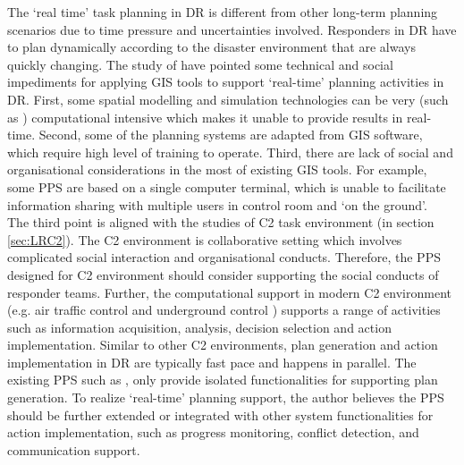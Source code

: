 The `real time' task planning in \ac{DR} is different from other long-term planning scenarios due to time pressure and uncertainties involved.  Responders in DR have to plan dynamically according to the disaster environment that are always quickly changing. The study of \cite{Zerger2003} have pointed some technical and social impediments for applying \ac{GIS} tools to support `real-time' planning activities in DR. First, some spatial modelling and simulation technologies can be very (such as \cite{Eglese1994} ) computational intensive which makes it unable to provide results in real-time. Second, some of the planning systems are adapted from \ac{GIS} software, which require high level of training to operate. Third, there are lack of social and organisational considerations in the most of existing \ac{GIS} tools. For example, some PPS are based on a single computer terminal, which is unable to facilitate information sharing with multiple users in control room and `on the ground'. \\

The third point is aligned with the studies of \ac{C2} task environment (in section \ref{sec:LRC2}). The C2 environment is collaborative setting which involves complicated social interaction and organisational conducts. Therefore, the PPS designed for \ac{C2} environment should consider supporting the social conducts of responder teams. Further, the computational support in modern \ac{C2} environment (e.g. air traffic control \cite{Mercer2014} and underground control \cite{Sharples2011}) supports a range of activities such as information acquisition, analysis, decision selection and action implementation. Similar to other \ac{C2} environments, plan generation and action implementation in DR are typically fast pace and happens in parallel. The existing PPS such as \cite{IntergraphCorporation2000}, \cite{Eglese1994} only provide isolated functionalities for supporting plan generation. To realize `real-time' planning support, the author believes the PPS should be further extended or integrated with other system functionalities for action implementation, such as progress monitoring, conflict detection, and communication support.\\


